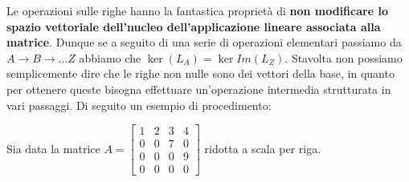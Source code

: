 \documentclass[12pt]{report}
\begin{document}
	Le operazioni sulle righe hanno la fantastica proprietà di \textbf{non modificare lo spazio vettoriale dell'nucleo dell'applicazione lineare associata alla matrice}.
	Dunque se a seguito di una serie di operazioni elementari passiamo da $A \to B \to \dots Z$ abbiamo che $\ker(L_A) = \ker{Im}(L_Z)$.
	Stavolta non possiamo semplicemente dire che le righe non nulle sono dei vettori della base, in quanto per ottenere queste bisogna effettuare un'operazione intermedia strutturata in vari passaggi. Di seguito un esempio di procedimento:
	
	Sia data la matrice $A = \begin{bmatrix}
		1 & 2 & 3 & 4\\
		0 & 0 & 7 & 0\\
		0 & 0 & 0 & 9\\
		0 & 0 & 0 & 0
	\end{bmatrix}$ ridotta a scala per riga.
	
\end{document}
